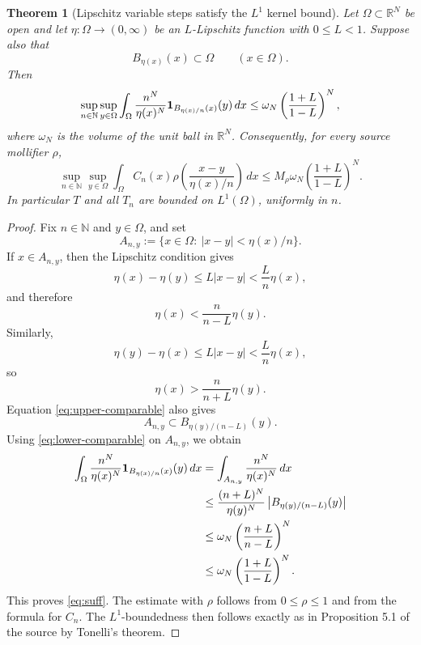 \documentclass[11pt]{article}
\newtheorem{theorem}{Theorem}
\newcommand{\R}{\mathbb R}
\newcommand{\N}{\mathbb N}
\newcommand{\OmegaN}{\omega_N}
\begin{document}
\begin{theorem}[Lipschitz variable steps satisfy the \(L^1\) kernel bound]
\label{thm:main}
Let \(\Omega\subset\R^N\) be open and let
\(\eta:\Omega\to(0,\infty)\) be an \(L\)-Lipschitz function with
\(0\le L<1\).  Suppose also that
\[
  B_{\eta(x)}(x)\subset\Omega\qquad (x\in\Omega).
\]
Then
\[
  \sup_{n\in\N}\sup_{y\in\Omega}
  \int_\Omega \frac{n^N}{\eta(x)^N}
  {\bf 1}_{B_{\eta(x)/n}(x)}(y)\,dx
  \le
  \OmegaN\left(\frac{1+L}{1-L}\right)^N,
\]
where \(\OmegaN\) is the volume of the unit ball in \(\R^N\).
Consequently, for every source mollifier \(\rho\),
\[
  \sup_{n\in\N}\sup_{y\in\Omega}
  \int_\Omega C_n(x)\rho\left(\frac{x-y}{\eta(x)/n}\right)\,dx
  \le
  M_\rho\OmegaN\left(\frac{1+L}{1-L}\right)^N.
\]
In particular \(T\) and all \(T_n\) are bounded on \(L^1(\Omega)\), uniformly
in \(n\).
\end{theorem}

\begin{proof}
Fix \(n\in\N\) and \(y\in\Omega\), and set
\[
  A_{n,y}:=\{x\in\Omega:\ |x-y|<\eta(x)/n\}.
\]
If \(x\in A_{n,y}\), then the Lipschitz condition gives
\[
  \eta(x)-\eta(y)\le L|x-y|< \frac{L}{n}\eta(x),
\]
and therefore
\begin{equation}\label{eq:upper-comparable}
  \eta(x)<\frac{n}{n-L}\eta(y).
\end{equation}
Similarly,
\[
  \eta(y)-\eta(x)\le L|x-y|< \frac{L}{n}\eta(x),
\]
so
\begin{equation}\label{eq:lower-comparable}
  \eta(x)>\frac{n}{n+L}\eta(y).
\end{equation}
Equation \eqref{eq:upper-comparable} also gives
\[
  A_{n,y}\subset B_{\eta(y)/(n-L)}(y).
\]
Using \eqref{eq:lower-comparable} on \(A_{n,y}\), we obtain
\begin{align*}
  \int_\Omega \frac{n^N}{\eta(x)^N}
  {\bf 1}_{B_{\eta(x)/n}(x)}(y)\,dx
  &=
  \int_{A_{n,y}} \frac{n^N}{\eta(x)^N}\,dx \\
  &\le
  \frac{ (n+L)^N}{\eta(y)^N}
  \left|B_{\eta(y)/(n-L)}(y)\right| \\
  &\le
  \OmegaN\left(\frac{n+L}{n-L}\right)^N \\
  &\le
  \OmegaN\left(\frac{1+L}{1-L}\right)^N.
\end{align*}
This proves \eqref{eq:suff}.  The estimate with \(\rho\) follows from
\(0\le\rho\le1\) and from the formula for \(C_n\).  The \(L^1\)-boundedness
then follows exactly as in Proposition 5.1 of the source by Tonelli's theorem.
\end{proof}
\end{document}
